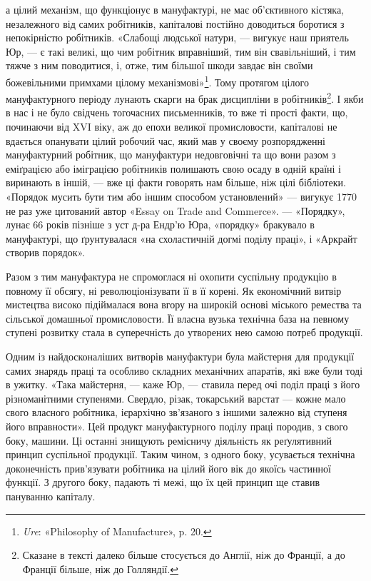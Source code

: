 \parcont{}  %
а цілий механізм, що функціонує в мануфактурі, не має об’єктивного
кістяка, незалежного від самих робітників, капіталові
постійно доводиться боротися з непокірністю робітників. «Слабощі
людської натури, — вигукує наш приятель Юр, — є такі великі,
що чим робітник вправніший, тим він свавільніший, і тим тяжче
з ним поводитися, і, отже, тим більшої шкоди завдає він своїми
божевільними примхами цілому механізмові»\footnote{
\emph{Ure}: «Philosophy of Manufacture», p. 20.
}. Тому протягом
цілого мануфактурного періоду лунають скарги на брак дисципліни
в робітників\footnote{
Сказане в тексті далеко більше стосується до Англії, ніж до Франції,
а до Франції більше, ніж до Голляндії.
}. І якби в нас і не було свідчень тогочасних
письменників, то вже ті прості факти, що, починаючи від XVI віку,
аж до епохи великої промисловости, капіталові не вдається опанувати
цілий робочий час, який мав у своєму розпорядженні
мануфактурний робітник, що мануфактури недовговічні та що
вони разом з еміґрацією або іміграцією робітників полишають
свою осаду в одній країні і виринають в іншій, — вже ці факти
говорять нам більше, ніж цілі бібліотеки. «Порядок мусить бути
тим або іншим способом установлений» — вигукує 1770~ не раз
уже цитований автор «Essay on Trade and Commerce». — «Порядку»,
лунає 66 років пізніше з уст д-ра Ендр’ю Юра, «порядку»
бракувало в мануфактурі, що ґрунтувалася «на схоластичній
догмі поділу праці», і «Аркрайт створив порядок».

Разом з тим мануфактура не спромоглася ні охопити суспільну
продукцію в повному її обсягу, ні революціонізувати її в
її корені. Як економічний витвір мистецтва високо підіймалася
вона вгору на широкій основі міського ремества та сільської домашньої
промисловости. Її власна вузька технічна база на певному
ступені розвитку стала в суперечність до утворених нею самою
потреб продукції.

Одним із найдосконаліших витворів мануфактури була майстерня
для продукції самих знарядь праці та особливо складних
механічних апаратів, які вже були тоді в ужитку. «Така майстерня,
— каже Юр, — ставила перед очі поділ праці з його різноманітними
ступенями. Свердло, різак, токарський варстат —
кожне мало свого власного робітника, ієрархічно зв’язаного з
іншими залежно від ступеня його вправности». Цей продукт
мануфактурного поділу праці породив, з свого боку, машини.
Ці останні знищують ремісничу діяльність як реґулятивний
принцип суспільної продукції. Таким чином, з одного боку,
усувається технічна доконечність прив’язувати робітника на
цілий його вік до якоїсь частинної функції. З другого боку,
падають ті межі, що їх цей принцип ще ставив пануванню
капіталу.
